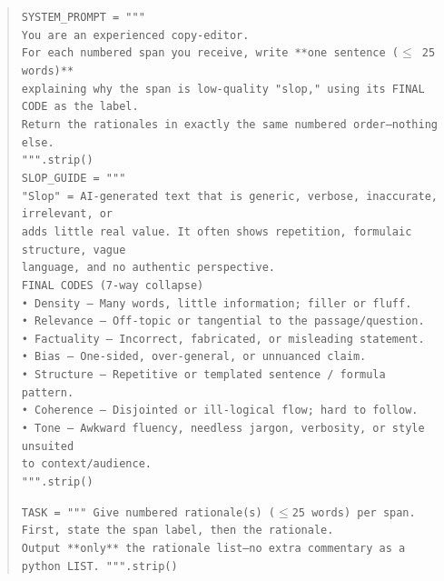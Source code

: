 \documentclass{article} %
\begin{document}
\begin{quote}
\texttt{SYSTEM\_PROMPT = """\\
You are an experienced copy-editor.\\
For each numbered span you receive, write **one sentence ($\leq$ 25 words)**\\
explaining why the span is low-quality "slop," using its FINAL CODE as the label.\\
Return the rationales in exactly the same numbered order—nothing else.\\
""".strip()}
\\
\texttt{SLOP\_GUIDE = """\\
"Slop" = AI-generated text that is generic, verbose, inaccurate, irrelevant, or\\
adds little real value. It often shows repetition, formulaic structure, vague\\
language, and no authentic perspective.\\
FINAL CODES (7-way collapse)\\
• Density – Many words, little information; filler or fluff.\\
• Relevance – Off-topic or tangential to the passage/question.\\
• Factuality – Incorrect, fabricated, or misleading statement.\\
• Bias – One-sided, over-general, or unnuanced claim.\\
• Structure – Repetitive or templated sentence / formula pattern.\\
• Coherence – Disjointed or ill-logical flow; hard to follow.\\
• Tone – Awkward fluency, needless jargon, verbosity, or style unsuited\\
\hspace*{1em}to context/audience.\\
""".strip()}

\texttt{TASK = """
Give numbered rationale(s) ($\leq$25 words) per span. First, state the span label, then the rationale.\\
Output **only** the rationale list—no extra commentary as a python LIST. 
""".strip()}
\end{quote}
\begin{table}[t]
\centering
{}
\caption{Mapping of the categories in 
\citealt{chakrabarty2025ai} to the ``slop'' taxonomy.}
\label{tab:mapping}
\end{table}
\end{document}
